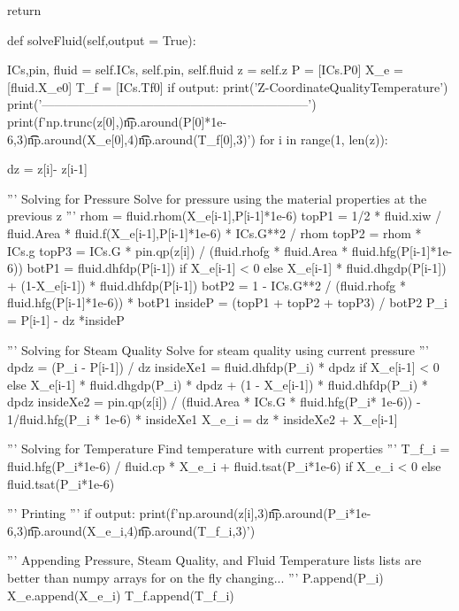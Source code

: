 \documentclass{article}
\begin{document}
\begin{python}
        return


    def solveFluid(self,output = True):
        
        ICs,pin, fluid = self.ICs, self.pin, self.fluid
        z = self.z
        P = [ICs.P0]
        X_e = [fluid.X_e0]
        T_f = [ICs.Tf0]
        if output:
            print('Z-Coordinate\tPressure\tSteam Quality\tFluid Temperature')
            print('-----------------------------------------------------------------')
            print(f'{np.trunc(z[0],)}\t\t{np.around(P[0]*1e-6,3)}\t\t{np.around(X_e[0],4)}\t\t{np.around(T_f[0],3)}')
        for i in range(1, len(z)):
            
            dz = z[i]- z[i-1]
            
            '''
            Solving for Pressure
            Solve for pressure using the material properties at the previous z
            '''
            rhom = fluid.rhom(X_e[i-1],P[i-1]*1e-6)
            topP1 = 1/2 * fluid.xiw / fluid.Area * fluid.f(X_e[i-1],P[i-1]*1e-6) * ICs.G**2 / rhom
            topP2 = rhom * ICs.g
            topP3 = ICs.G * pin.qp(z[i]) / (fluid.rhofg * fluid.Area * fluid.hfg(P[i-1]*1e-6))
            botP1 =  fluid.dhfdp(P[i-1]) if X_e[i-1] < 0 else X_e[i-1] * fluid.dhgdp(P[i-1]) + (1-X_e[i-1]) * fluid.dhfdp(P[i-1])
            botP2 = 1 - ICs.G**2 / (fluid.rhofg * fluid.hfg(P[i-1]*1e-6)) * botP1
            insideP = (topP1 + topP2 + topP3) / botP2
            P_i = P[i-1] - dz *insideP

            '''
            Solving for Steam Quality
            Solve for steam quality using current pressure
            '''
            dpdz = (P_i - P[i-1]) / dz
            insideXe1 = fluid.dhfdp(P_i) * dpdz if X_e[i-1] < 0 else X_e[i-1] * fluid.dhgdp(P_i) * dpdz + (1 - X_e[i-1]) * fluid.dhfdp(P_i) * dpdz
            insideXe2 = pin.qp(z[i]) / (fluid.Area * ICs.G * fluid.hfg(P_i* 1e-6)) - 1/fluid.hfg(P_i * 1e-6) * insideXe1
            X_e_i = dz * insideXe2 + X_e[i-1]

            '''
            Solving for Temperature
            Find temperature with current properties
            '''
            T_f_i = fluid.hfg(P_i*1e-6) / fluid.cp * X_e_i + fluid.tsat(P_i*1e-6) if X_e_i < 0 else fluid.tsat(P_i*1e-6)

            '''
            Printing
            '''
            if output:
                print(f'{np.around(z[i],3)}\t\t{np.around(P_i*1e-6,3)}\t\t{np.around(X_e_i,4)}\t\t{np.around(T_f_i,3)}')
            
            '''
            Appending Pressure, Steam Quality, and Fluid Temperature lists
            lists are better than numpy arrays for on the fly changing...
            '''
            P.append(P_i)
            X_e.append(X_e_i)
            T_f.append(T_f_i)
            

\end{python}
\end{document}
